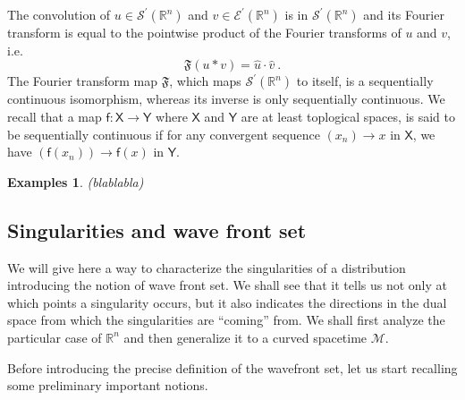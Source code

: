 \documentclass[11pt]{book}
\newcommand{\hilight}[1]{\colorbox{yellow!80!black}{#1}}
\newcommand{\Ecal}{\mathcal{E}}
\newcommand{\Mcal}{\mathcal{M}}
\newcommand{\Scal}{\mathcal{S}}
\newcommand{\Rbb}{\mathbb{R}}
\newcommand{\Frak}{\mathfrak{F}}
\newcommand{\Xsf}{\mathsf{X}}
\newcommand{\Ysf}{\mathsf{Y}}
\newcommand{\fsf}{\mathsf{f}}
\theoremstyle{break}
\newtheorem{examples}{Examples}[chapter]
\begin{document}
The convolution of $u \in \Scal^\prime(\Rbb^n)$ and $v\in \Ecal^\prime(\Rbb^n)$ is in $\Scal^\prime(\Rbb^n)$ and its Fourier transform is equal to the pointwise product of the Fourier transforms of $u$ and $v$, i.e.
%
\begin{equation*}
\Frak(u \ast v) = \hat{u} \cdot \hat{v} \ .
\end{equation*}
%
The Fourier transform map $\Frak$, which maps $\Scal^\prime(\Rbb^n)$ to itself, is a sequentially continuous isomorphism, whereas its inverse is only sequentially continuous. We recall that a map $\fsf : \Xsf \to \Ysf$ where $\Xsf$ and $\Ysf$ are at least toplogical spaces, is said to be sequentially continuous if for any convergent sequence $(x_n) \to x$ in $\Xsf$, we have $(\fsf(x_n)) \to \fsf(x)$ in $\Ysf$. 


\begin{examples}
\hilight{(blablabla)}
\end{examples}


\subsection{Singularities and wave front set}\label{p:SING_WF}


We will give here a way to characterize the singularities of a distribution introducing the notion of wave front set. We shall see that it tells us not only at which points a singularity occurs, but it also indicates the directions in the dual space from which the singularities are ``coming'' from. We shall first analyze the particular case of $\Rbb^n$ and then generalize it to a curved spacetime $\Mcal$. 


Before introducing the precise definition of the wavefront set, let us start recalling some preliminary important notions.
\end{document}
